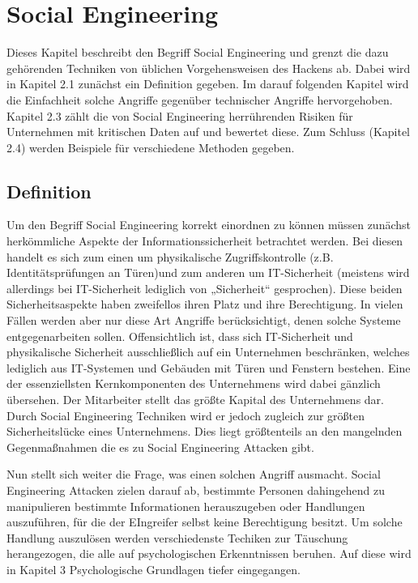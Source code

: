 \section{Social Engineering}\label{sec:socialengineering}
Dieses Kapitel beschreibt den Begriff Social Engineering und grenzt die dazu gehörenden Techniken von
üblichen Vorgehensweisen des Hackens ab. Dabei wird in Kapitel 2.1 zunächst ein Definition gegeben.
Im darauf folgenden Kapitel wird die Einfachheit solche Angriffe gegenüber technischer Angriffe
hervorgehoben.
Kapitel 2.3 zählt die von Social Engineering herrührenden Risiken für Unternehmen mit kritischen Daten
auf und bewertet diese.
Zum Schluss (Kapitel 2.4) werden Beispiele für verschiedene Methoden gegeben.

\subsection{Definition}\label{sec:definition}
Um den Begriff Social Engineering korrekt einordnen zu können müssen zunächst herkömmliche Aspekte der
Informationssicherheit betrachtet werden.
Bei diesen handelt es sich zum einen um physikalische Zugriffskontrolle (z.B. Identitätsprüfungen an
Türen)und zum anderen um IT-Sicherheit (meistens wird allerdings bei IT-Sicherheit lediglich von
„Sicherheit“ gesprochen).
Diese beiden Sicherheitsaspekte haben zweifellos ihren Platz und ihre Berechtigung.
In vielen Fällen werden aber nur diese Art Angriffe berücksichtigt, denen solche Systeme
entgegenarbeiten sollen.
Offensichtlich ist, dass sich IT-Sicherheit und physikalische Sicherheit ausschließlich auf ein
Unternehmen beschränken, welches lediglich aus IT-Systemen und Gebäuden mit Türen und Fenstern
bestehen.
Eine der essenziellsten Kernkomponenten des Unternehmens wird dabei gänzlich übersehen.
Der Mitarbeiter stellt das größte Kapital des Unternehmens dar. Durch Social Engineering Techniken
wird er jedoch zugleich zur größten Sicherheitslücke eines Unternehmens.
Dies liegt größtenteils an den mangelnden Gegenmaßnahmen die es zu Social Engineering Attacken gibt.

Nun stellt sich weiter die Frage, was einen solchen Angriff ausmacht.
Social Engineering Attacken zielen darauf ab, bestimmte Personen dahingehend zu manipulieren bestimmte
Informationen herauszugeben oder Handlungen auszuführen, für die der EIngreifer selbst keine
Berechtigung besitzt.
Um solche Handlung auszulösen werden verschiedenste Techiken zur Täuschung herangezogen, die alle auf
psychologischen Erkenntnissen beruhen.
Auf diese wird in Kapitel 3 Psychologische Grundlagen tiefer eingegangen.

